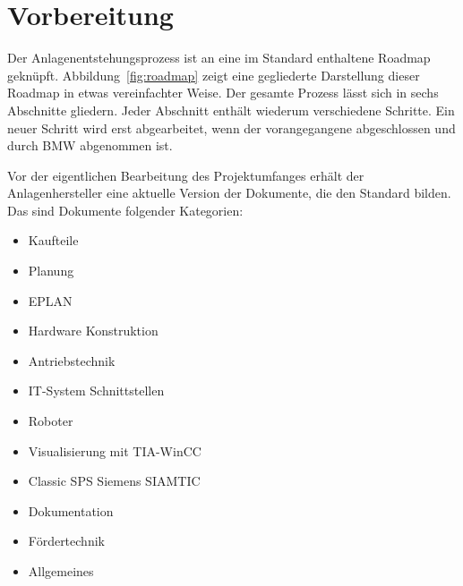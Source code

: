 


\section{Vorbereitung}
\label{sec:preparation}

Der Anlagenentstehungsprozess ist an eine im Standard enthaltene Roadmap geknüpft. Abbildung~\ref{fig:roadmap} zeigt eine gegliederte Darstellung dieser Roadmap in etwas vereinfachter Weise. %
Der gesamte Prozess lässt sich in sechs Abschnitte gliedern. Jeder Abschnitt enthält wiederum verschiedene Schritte. Ein neuer Schritt wird erst abgearbeitet, wenn der vorangegangene abgeschlossen und durch BMW abgenommen ist.

Vor der eigentlichen Bearbeitung des Projektumfanges erhält der Anlagenhersteller eine aktuelle Version der Dokumente, die den Standard bilden. Das sind Dokumente folgender Kategorien:
  \begin{itemize}
    \itemsep0.1em
    \item Kaufteile
    \item Planung
    \item EPLAN
    \item Hardware Konstruktion
    \item Antriebstechnik
    \item IT-System Schnittstellen
    \item Roboter
    \item Visualisierung mit TIA-WinCC
    \item Classic SPS Siemens SIAMTIC
    \item Dokumentation
    \item Fördertechnik
    \item Allgemeines
  \end{itemize}

